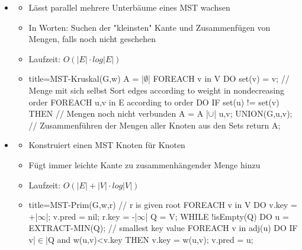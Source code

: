 \documentclass[
    12pt,
    a4paper,
    ngerman,
    color=3b,%
    marginpar=false,
    colorback=false,
    leqno,
]{tudaexercise}
\begin{document}
\begin{itemize}
        \item {}
            \begin{itemize}
                \item Lässt parallel mehrere Unterbäume eines MST wachsen
                \item In Worten: Suchen der \string"kleinsten\string" Kante und Zusammenfügen von Mengen, falls noch nicht geschehen
                \item Laufzeit: $O(|E| \cdot log|E|)$
                \item[]
                    \begin{ccode}[autogobble,escapeinside=||]{title={MST-Kruskal(G,w)}}
                    A = |$\emptyset$|
                    FOREACH v in V DO
                        set(v) = {v};       // Menge mit sich selbst
                    Sort edges according to weight in nondecreasing order
                    FOREACH {u,v} in E according to order DO
                        IF set(u) != set(v) THEN    // Mengen noch nicht verbunden
                            A = A |$\cup$| {{u,v}}; 
                            UNION(G,u,v);   // Zusammenführen der Mengen aller Knoten aus den Sets
                    return A;
                    \end{ccode}
            \end{itemize}
            \clearpage
        \item {}
            \begin{itemize}
                \item Konstruiert einen MST Knoten für Knoten
                \item Fügt immer leichte Kante zu zusammenhängender Menge hinzu
                \item Laufzeit: $O(|E| + |V| \cdot log|V|)$
                \item[]
                    \begin{ccode}[autogobble,escapeinside=||]{title={MST-Prim(G,w,r) // r is given root}}
                    FOREACH v in V DO 
                        v.key = +|$\infty$|;
                        v.pred = nil;
                    r.key = -|$\infty$|
                    Q = V;
                    WHILE !isEmpty(Q) DO
                        u = EXTRACT-MIN(Q);     // smallest key value
                        FOREACH v in adj(u) DO
                            IF v|$\in$|Q and w({u,v})<v.key THEN
                                v.key = w({u,v});
                                v.pred = u;
                    \end{ccode}
            \end{itemize}
        
    \end{itemize}
\end{document}
